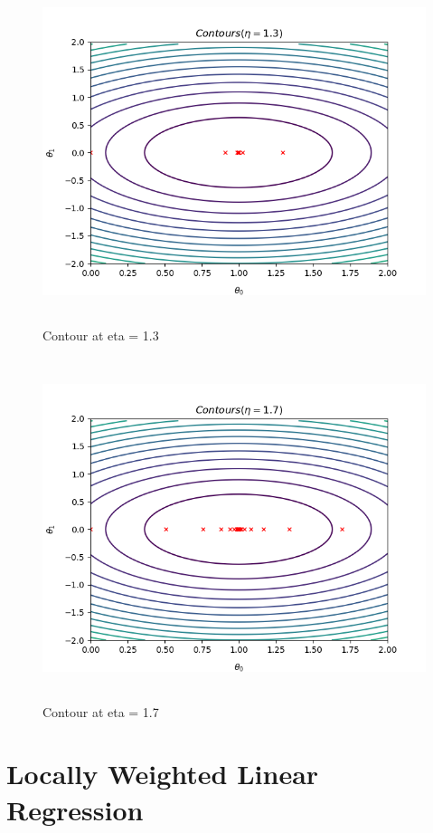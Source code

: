 \documentclass[10pt]{article}
\begin{document}
\begin{figure}[H]
	\includegraphics[width = 15cm,height = 10cm]{Q1_d13}
	\caption{Contour at eta = 1.3}
\end{figure}

\begin{figure}[H]
	\includegraphics[width = 15cm,height = 10cm]{Q1_d17}
	\caption{Contour at eta = 1.7}
\end{figure}

\section{Locally Weighted Linear Regression}
\end{document}
